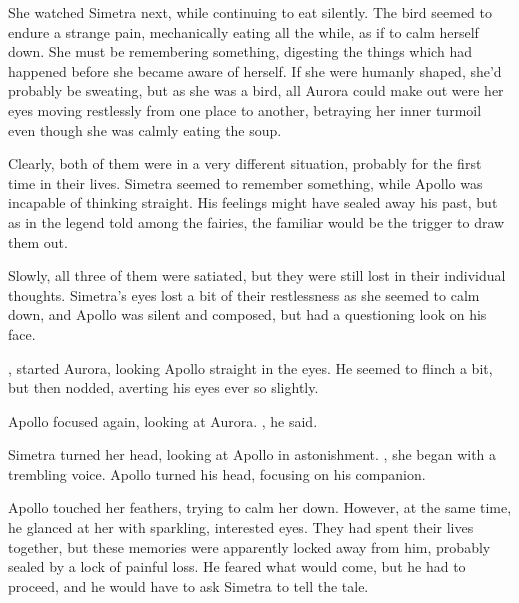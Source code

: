 She watched Simetra next, while continuing to eat silently. The bird seemed to endure a strange pain, mechanically eating all the while, as if to calm herself down. She must be remembering something, digesting the things which had happened before she became aware of herself. If she were humanly shaped, she'd probably be sweating, but as she was a bird, all Aurora could make out were her eyes moving restlessly from one place to another, betraying her inner turmoil even though she was calmly eating the soup.

Clearly, both of them were in a very different situation, probably for the first time in their lives. Simetra seemed to remember something, while Apollo was incapable of thinking straight. His feelings might have sealed away his past, but as in the legend told among the fairies, the familiar would be the trigger to draw them out. 

\fancybreaker{}

Slowly, all three of them were satiated, but they were still lost in their individual thoughts. Simetra's eyes lost a bit of their restlessness as she seemed to calm down, and Apollo was silent and composed, but had a questioning look on his face.

, started Aurora, looking Apollo straight in the eyes. He seemed to flinch a bit, but then nodded, averting his eyes ever so slightly. 

Apollo focused again, looking at Aurora. , he said. 

Simetra turned her head, looking at Apollo in astonishment. , she began with a trembling voice. Apollo turned his head, focusing on his companion. 

Apollo touched her feathers, trying to calm her down. However, at the same time, he glanced at her with sparkling, interested eyes. They had spent their lives together, but these memories were apparently locked away from him, probably sealed by a lock of painful loss. He feared what would come, but he had to proceed, and he would have to ask Simetra to tell the tale.

